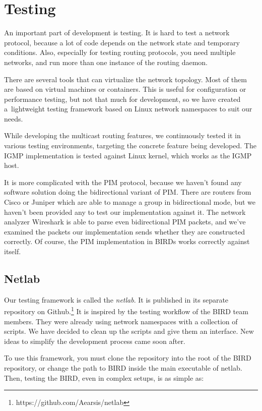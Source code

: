 \chapter{Testing}

An important part of development is testing. It is hard to test a network
protocol, because a lot of code depends on the network state and temporary
conditions. Also, especially for testing routing protocols, you need multiple
networks, and run more than one instance of the routing daemon.

There are several tools that can virtualize the network topology. Most of them are
based on virtual machines or containers. This is useful for configuration or
performance testing, but not that much for development, so we have created
a~lightweight testing framework based on Linux network namespaces to suit our
needs.

While developing the multicast routing features, we continuously tested it in
various testing environments, targeting the concrete feature being developed.
The IGMP implementation is tested against Linux kernel, which works as the IGMP
host.

It is more complicated with the PIM protocol, because we haven't
found any software solution doing the bidirectional variant of PIM. There are
routers from Cisco or Juniper which are able to manage a group in bidirectional
mode, but we haven't been provided any to test our implementation against it.
The network analyzer Wireshark is able to parse even bidirectional PIM packets,
and we've examined the packets our implementation sends whether they are
constructed correctly. Of course, the PIM implementation in BIRDs works
correctly against itself.

\section{Netlab}
Our testing framework is called the \emph{netlab}. It is published in its
separate repository on Github.\footnote{https://github.com/Aearsis/netlab}
It is inspired by the testing workflow of the BIRD team members. They were
already using network namespaces with a collection of scripts. We have decided
to clean up the scripts and give them an interface. New ideas to simplify the
development process came soon after.

To use this framework, you must clone the repository into the root of the BIRD
repository, or change the path to BIRD inside the main executable of netlab.
Then, testing the BIRD, even in complex setups, is as simple as:

